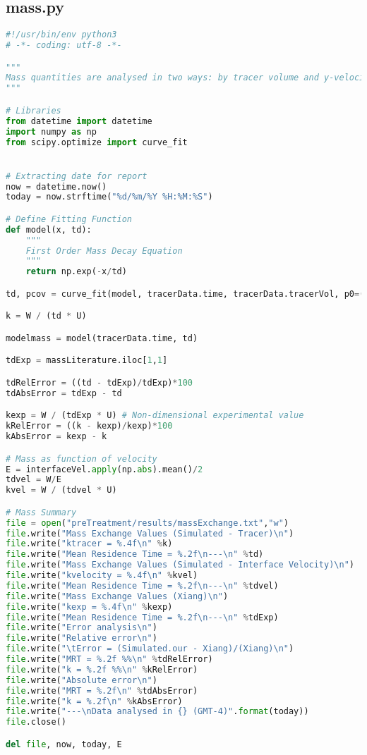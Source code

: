\documentclass[../main.tex]{subfiles}
\begin{document}
\subsection{mass.py}
\begin{lstlisting}[language=python]
#!/usr/bin/env python3
# -*- coding: utf-8 -*-

"""
Mass quantities are analysed in two ways: by tracer volume and y-velocity
"""

# Libraries
from datetime import datetime
import numpy as np
from scipy.optimize import curve_fit


# Extracting date for report
now = datetime.now()
today = now.strftime("%d/%m/%Y %H:%M:%S")

# Define Fitting Function
def model(x, td):
    """
    First Order Mass Decay Equation
    """
    return np.exp(-x/td)

td, pcov = curve_fit(model, tracerData.time, tracerData.tracerVol, p0=(120))

k = W / (td * U)

modelmass = model(tracerData.time, td)

tdExp = massLiterature.iloc[1,1]

tdRelError = ((td - tdExp)/tdExp)*100
tdAbsError = tdExp - td

kexp = W / (tdExp * U) # Non-dimensional experimental value
kRelError = ((k - kexp)/kexp)*100
kAbsError = kexp - k

# Mass as function of velocity
E = interfaceVel.apply(np.abs).mean()/2
tdvel = W/E
kvel = W / (tdvel * U)

# Mass Summary
file = open("preTreatment/results/massExchange.txt","w")
file.write("Mass Exchange Values (Simulated - Tracer)\n")
file.write("ktracer = %.4f\n" %k)
file.write("Mean Residence Time = %.2f\n---\n" %td)
file.write("Mass Exchange Values (Simulated - Interface Velocity)\n")
file.write("kvelocity = %.4f\n" %kvel)
file.write("Mean Residence Time = %.2f\n---\n" %tdvel)
file.write("Mass Exchange Values (Xiang)\n")
file.write("kexp = %.4f\n" %kexp)
file.write("Mean Residence Time = %.2f\n---\n" %tdExp)
file.write("Error analysis\n")
file.write("Relative error\n")
file.write("\tError = (Simulated.our - Xiang)/(Xiang)\n")
file.write("MRT = %.2f %%\n" %tdRelError)
file.write("k = %.2f %%\n" %kRelError)
file.write("Absolute error\n")
file.write("MRT = %.2f\n" %tdAbsError)
file.write("k = %.2f\n" %kAbsError)
file.write("---\nData analysed in {} (GMT-4)".format(today))
file.close()

del file, now, today, E
\end{lstlisting}
\end{document}
